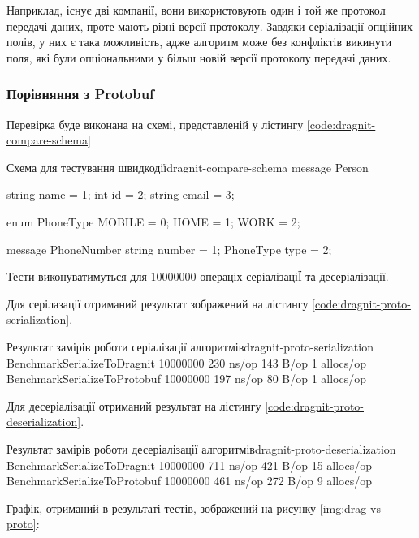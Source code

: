 \documentclass{lib/styles/default-style}
\begin{document}
    Наприклад, існує дві компанії, вони використовують один і той же протокол передачі даних, проте мають різні версії протоколу.
    Завдяки серіалізації опційних полів, у них є така можливість, адже алгоритм може без конфліктів викинути поля, які були опціональними
    у більш новій версії протоколу передачі даних.

    \subsubsection{Порівняння з Protobuf}

    Перевірка буде виконана на схемі, представленій у лістингу \ref{code:dragnit-compare-schema}
    
    \begin{stdout}{Схема для тестування швидкодії}{dragnit-compare-schema}
        message Person {
            string name = 1;
            int id = 2;
            string email = 3;

            enum PhoneType {
                MOBILE = 0;
                HOME = 1;
                WORK = 2;
            }

            message PhoneNumber {
                string number = 1;
                PhoneType type = 2;
            }
        }\end{stdout}

    Тести виконуватимуться для 10000000 операціх серіалізаціЇ та десеріалізації.

    Для серілазації отриманий результат зображений на лістингу \ref{code:dragnit-proto-serialization}.
    \begin{stdout}{Результат замірів роботи серіалізації алгоритмів}{dragnit-proto-serialization}
        BenchmarkSerializeToDragnit  10000000  230 ns/op  143 B/op  1 allocs/op
        BenchmarkSerializeToProtobuf 10000000  197 ns/op  80 B/op   1 allocs/op\end{stdout}

    Для десеріалізації отриманий результат на лістингу \ref{code:dragnit-proto-deserialization}.
    
    \begin{stdout}{Результат замірів роботи десеріалізації алгоритмів}{dragnit-proto-deserialization}
        BenchmarkSerializeToDragnit  10000000  711 ns/op  421 B/op  15 allocs/op
        BenchmarkSerializeToProtobuf 10000000  461 ns/op  272 B/op   9 allocs/op\end{stdout}

    Графік, отриманий в результаті тестів, зображений на рисунку \ref{img:drag-vs-proto}:
\end{document}
